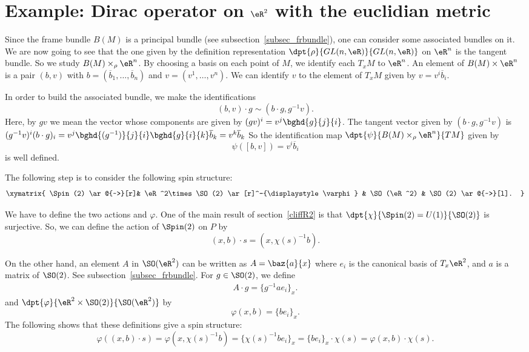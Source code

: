 \section[Dirac operator on  \texorpdfstring{$\eR^2$}{R2}]{Example: Dirac operator on \texorpdfstring{$\eR^2$}{R2} with the euclidian metric}\label{Pg_exempleRdeux}


Since the frame bundle $B(M)$ is a principal bundle (see subsection~\ref{subsec_frbundle}), one can consider some associated bundles on it. We are now going to see that the one given by the definition representation $\dpt{\rho}{GL(n,\eR)}{GL(n,\eR)}$ on $\eR^n$ is the tangent bundle. So we study $B(M)\times_{\rho} \eR^n$. By choosing a basis on each point of $M$, we identify each $T_xM$ to $\eR^n$. An element of $B(M)\times \eR^n$ is a pair $(b,v)$ with $b=(\overline{b}_1,\ldots,\overline{b}_n)$ and $v=(v^1,\ldots,v^n)$. We can identify $v$ to the element of $T_xM$ given by $v=v^i\overline{b}_i$.

In order to build the associated bundle, we make the identifications
\[
	(b,v)\cdot g\sim(b\cdot g,g^{-1} v).
\]
Here, by $gv$ we mean the vector whose components are given by $(gv)^i=v^j\bghd{g}{j}{i}$. The tangent vector given by $(b\cdot g,g^{-1} v)$ is $(g^{-1} v)^i(b\cdot g)_i=v^j\bghd{(g^{-1})}{j}{i}\bghd{g}{i}{k}\overline{b}_k=v^k\overline{b}_k$ So the identification map $\dpt{\psi}{B(M)\times_{\rho}\eR^n}{TM}$ given by
\[
	\psi([b,v])=v^i\overline{b}_i
\]
is well defined.

The following step is to consider the following spin structure:
\[\xymatrix{
	\Spin(2)  \ar@{~>}[r]&  \eR^2\times \SO(2) \ar[r]^-{\displaystyle\varphi} & \SO(\eR^2)  & \SO(2) \ar@{~>}[l].
	}\]

We have to define the two actions and $\varphi$. One of the main result of section~\ref{cliffR2} is that $\dpt{\chi}{\Spin(2)=U(1)}{\SO(2)}$ is surjective. So, we can define the action of $\Spin(2)$ on $P$ by
\[(x,b)\cdot s=(x,\chi(s)^{-1} b).\]

On the other hand, an element $A$ in $\SO(\eR^2)$ can be written as $A=\baz{a}{x}$ where $e_i$ is the canonical basis of $T_x\eR^2$, and $a$ is a matrix of $\SO(2)$. See subsection~\ref{subsec_frbundle}. For $g\in \SO(2)$, we define
\begin{eqnarray}
	\label{r1504d2}A\cdot g=\{g^{-1} ae_i\}_x.
\end{eqnarray}
and  $\dpt{\varphi}{\eR^2\times \SO(2)}{\SO(\eR^2)}$ by
\[
	\varphi(x,b)=\{be_i\}_x.
\]
The following shows that these definitions give a spin structure:
\begin{equation}
	\varphi((x,b)\cdot s)=\varphi(x,\chi(s)^{-1} b)
	=\{\chi(s)^{-1} be_i\}_x
	=\{be_i\}_x\cdot\chi(s)
	=\varphi(x,b)\cdot\chi(s).
\end{equation}


